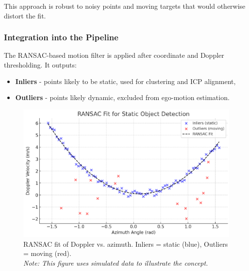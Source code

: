 This approach is robust to noisy points and moving targets that would otherwise distort the fit.

\subsubsection*{Integration into the Pipeline}
The RANSAC-based motion filter is applied after coordinate and Doppler thresholding. 
It outputs:
\begin{itemize}
    \item \textbf{Inliers} - points likely to be static, used for clustering and ICP alignment,
    \item \textbf{Outliers} - points likely dynamic, excluded from ego-motion estimation.
\end{itemize}

\begin{figure}[!htbp]
    \centering
    \includegraphics[width=1.0\linewidth]{images/RANSAC.png}
    \caption{RANSAC fit of Doppler vs. azimuth. Inliers = static (blue), Outliers = moving (red).\\
    \textit{Note: This figure uses simulated data to illustrate the concept.}}
    \label{fig:ransac_simulated_static_dynamic}
\end{figure}

